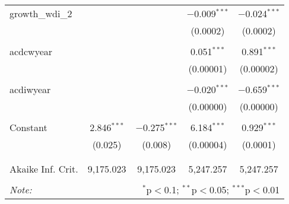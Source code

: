 \begin{table}[!htbp]
\begin{tabular}{@{\extracolsep{5pt}}lcccc}
 growth\_wdi\_2 &  &  & $-$0.009$^{***}$ & $-$0.024$^{***}$ \\ 
  &  &  & (0.0002) & (0.0002) \\ 
  & & & & \\ 
 acdcwyear &  &  & 0.051$^{***}$ & 0.891$^{***}$ \\ 
  &  &  & (0.00001) & (0.00002) \\ 
  & & & & \\ 
 acdiwyear &  &  & $-$0.020$^{***}$ & $-$0.659$^{***}$ \\ 
  &  &  & (0.00000) & (0.00000) \\ 
  & & & & \\ 
 Constant & 2.846$^{***}$ & $-$0.275$^{***}$ & 6.184$^{***}$ & 0.929$^{***}$ \\ 
  & (0.025) & (0.008) & (0.00004) & (0.0001) \\ 
  & & & & \\ 
\hline \\[-1.8ex] 
Akaike Inf. Crit. & 9,175.023 & 9,175.023 & 5,247.257 & 5,247.257 \\ 
\hline 
\hline \\[-1.8ex] 
\textit{Note:}  & \multicolumn{4}{r}{$^{*}$p$<$0.1; $^{**}$p$<$0.05; $^{***}$p$<$0.01} \\ 
\end{tabular} 
\end{table} 
